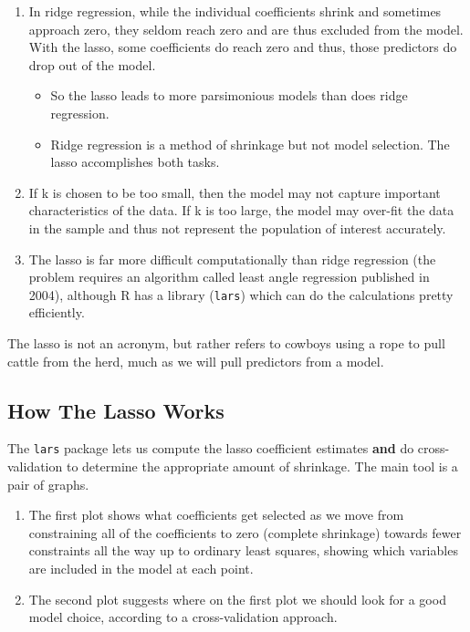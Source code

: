 \documentclass[]{book}
\providecommand{\tightlist}{%
  \setlength{\itemsep}{0pt}\setlength{\parskip}{0pt}}
\theoremstyle{definition}
\theoremstyle{definition}
\theoremstyle{definition}
\theoremstyle{remark}
\begin{document}
\begin{enumerate}
\def\labelenumi{\arabic{enumi}.}
\tightlist
\item
  In ridge regression, while the individual coefficients shrink and
  sometimes approach zero, they seldom reach zero and are thus excluded
  from the model. With the lasso, some coefficients do reach zero and
  thus, those predictors do drop out of the model.

  \begin{itemize}
  \tightlist
  \item
    So the lasso leads to more parsimonious models than does ridge
    regression.
  \item
    Ridge regression is a method of shrinkage but not model selection.
    The lasso accomplishes both tasks.
  \end{itemize}
\item
  If k is chosen to be too small, then the model may not capture
  important characteristics of the data. If k is too large, the model
  may over-fit the data in the sample and thus not represent the
  population of interest accurately.
\item
  The lasso is far more difficult computationally than ridge regression
  (the problem requires an algorithm called least angle regression
  published in 2004), although R has a library (\texttt{lars}) which can
  do the calculations pretty efficiently.
\end{enumerate}

The lasso is not an acronym, but rather refers to cowboys using a rope
to pull cattle from the herd, much as we will pull predictors from a
model.

\subsection{How The Lasso Works}\label{how-the-lasso-works}

The \texttt{lars} package lets us compute the lasso coefficient
estimates \textbf{and} do cross-validation to determine the appropriate
amount of shrinkage. The main tool is a pair of graphs.

\begin{enumerate}
\def\labelenumi{\arabic{enumi}.}
\tightlist
\item
  The first plot shows what coefficients get selected as we move from
  constraining all of the coefficients to zero (complete shrinkage)
  towards fewer constraints all the way up to ordinary least squares,
  showing which variables are included in the model at each point.
\item
  The second plot suggests where on the first plot we should look for a
  good model choice, according to a cross-validation approach.
\end{enumerate}
\end{document}
